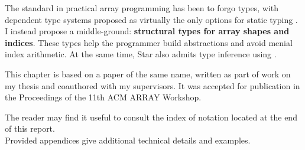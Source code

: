 The standard in practical array programming has been to forgo types, with dependent type systems proposed as virtually the only options for static typing \cite{dex}. I instead propose a middle-ground: \textbf{structural types for array shapes and indices}. These types help the programmer build abstractions and avoid menial index arithmetic. At the same time, Star also admits type inference using \inference{}.

This chapter is based on a paper of the same name, written as part of work on my thesis and coauthored with my supervisors. It was accepted for publication in the Proceedings of the 11th ACM ARRAY Workshop. 

\vfill
\begin{tcolorbox}[
    colback=violet!5!white,
    colframe=violet!70!black,
    title=\textsc{Reading notes}
]
The reader may find it useful to consult the index of notation located at the end of this report. \\ 
Provided appendices give additional technical details and examples.
\end{tcolorbox}
